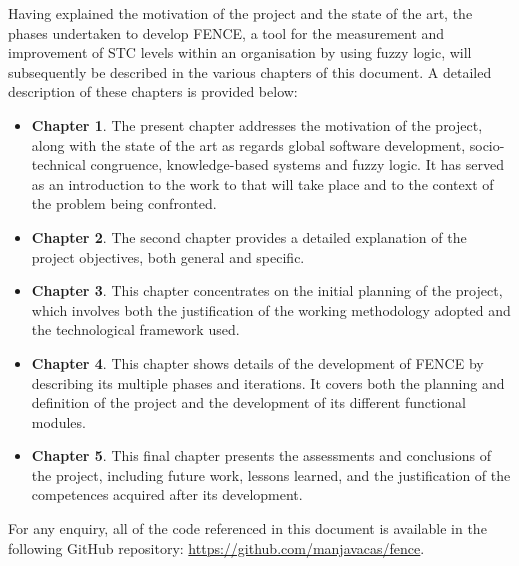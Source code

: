 Having explained the motivation of the project and the state of the art,  the phases undertaken to develop FENCE, a tool for the measurement and improvement of STC levels within an organisation by using fuzzy logic, will subsequently be described in the various chapters of this document. A detailed description of these chapters is  provided below:

\begin{itemize}
\item \textbf{Chapter 1}. The present chapter addresses the motivation of the project, along with the state of the art as regards global software development, socio-technical congruence, knowledge-based systems and fuzzy logic. It has served as an introduction to the work to that will take place and to the context of the problem being confronted.
\item \textbf{Chapter 2}. The second chapter provides a detailed explanation of the project objectives, both general and specific.
\item \textbf{Chapter 3}.  This chapter concentrates on the initial planning of the project, which involves both the justification of the working methodology adopted and the technological framework used.
\item \textbf{Chapter 4}. This chapter shows details of the development of FENCE by describing its multiple phases and iterations. It covers both the planning and definition of the project and the development of its different functional modules.
\item \textbf{Chapter 5}. This final chapter presents the assessments and conclusions of the project, including future work, lessons learned, and the justification of the competences acquired after its development.
\end{itemize}

For any enquiry, all of the code referenced in this document is available in the following GitHub repository: \url{https://github.com/manjavacas/fence}.


